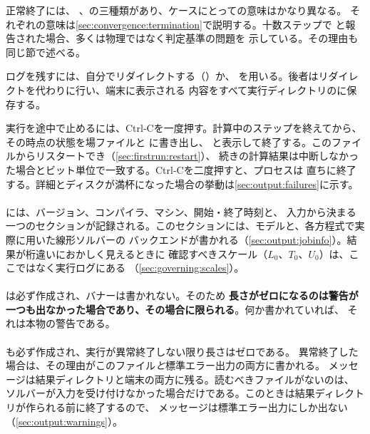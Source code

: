 正常終了には、
、の三種類があり、ケースにとっての意味はかなり異なる。
それぞれの意味は\cref{sec:convergence:termination}で説明する。十数ステップで
と報告された場合、多くは物理ではなく判定基準の問題を
示している。その理由も同じ節で述べる。

ログを残すには、自分でリダイレクトする（）か、
を用いる。後者はリダイレクトを代わりに行い、端末に表示される
内容をすべて実行ディレクトリのに保存する。

実行を途中で止めるには、Ctrl-Cを一度押す。計算中のステップを終えてから、その時点の状態を場ファイルと
に書き出し、
と表示して終了する。このファイルからリスタートでき（\cref{sec:firstrun:restart}）、
続きの計算結果は中断しなかった場合とビット単位で一致する。Ctrl-Cを二度押すと、プロセスは
直ちに終了する。詳細とディスクが満杯になった場合の挙動は\cref{sec:output:failures}に示す。

\paragraph{}には、バージョン、コンパイラ、マシン、開始・終了時刻と、
入力から決まる一つのセクションが記録される。このセクションには、モデルと、各方程式で実際に用いた線形ソルバーの
バックエンドが書かれる（\cref{sec:output:jobinfo}）。結果が桁違いにおかしく見えるときに
確認すべきスケール（$L_0$、$T_0$、$U_0$）は、ここではなく実行ログにある
（\cref{sec:governing:scales}）。

\paragraph{}は必ず作成され、バナーは書かれない。そのため
\textbf{長さがゼロになるのは警告が一つも出なかった場合であり、その場合に限られる}。何か書かれていれば、
それは本物の警告である。

\paragraph{}も必ず作成され、実行が異常終了しない限り長さはゼロである。
異常終了した場合は、その理由がこのファイル\emph{と}標準エラー出力の両方に書かれる。
メッセージは結果ディレクトリと端末の両方に残る。読むべきファイルがないのは、
ソルバーが入力を受け付けなかった場合だけである。このときは結果ディレクトリが作られる前に終了するので、
メッセージは標準エラー出力にしか出ない（\cref{sec:output:warnings}）。


